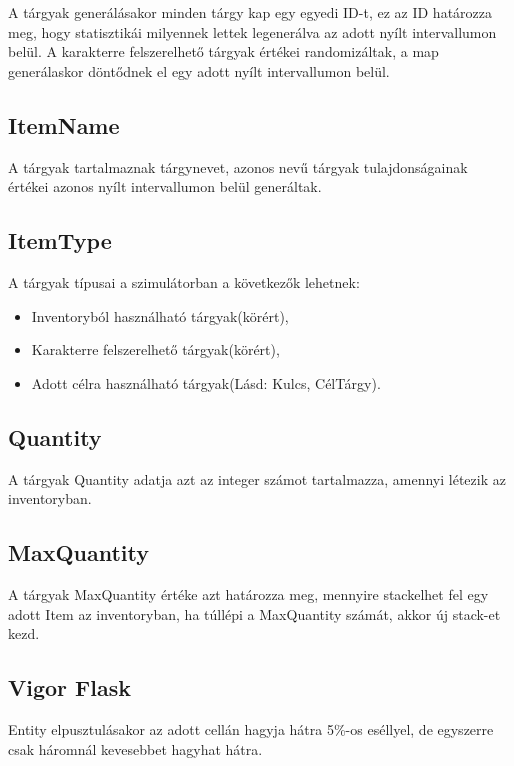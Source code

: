 A tárgyak generálásakor minden tárgy kap egy egyedi ID-t, ez az ID határozza meg, hogy statisztikái milyennek lettek legenerálva az adott nyílt intervallumon belül.
A karakterre felszerelhető tárgyak értékei randomizáltak, a map generálaskor döntődnek el egy adott nyílt intervallumon belül.

\subsection{ItemName}

A tárgyak tartalmaznak tárgynevet, azonos nevű tárgyak tulajdonságainak értékei azonos nyílt intervallumon belül generáltak.

\subsection{ItemType}

A tárgyak típusai a szimulátorban a következők lehetnek:
\begin{itemize}
    \item Inventoryból használható tárgyak(körért),
    \item Karakterre felszerelhető tárgyak(körért),
    \item Adott célra használható tárgyak(Lásd: Kulcs, CélTárgy).
\end{itemize}

\subsection{Quantity}

A tárgyak Quantity adatja azt az integer számot tartalmazza, amennyi létezik az inventoryban.

\subsection{MaxQuantity}

A tárgyak MaxQuantity értéke azt határozza meg, mennyire stackelhet fel egy adott Item az inventoryban, ha túllépi a MaxQuantity számát, akkor új stack-et kezd.


\subsection{Vigor Flask}

Entity elpusztulásakor az adott cellán hagyja hátra 5\%-os eséllyel, de egyszerre csak háromnál kevesebbet hagyhat hátra.


